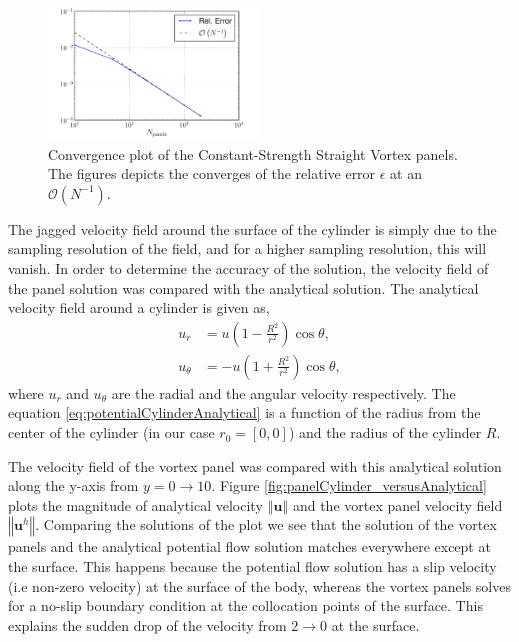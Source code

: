 	\begin{figure}[p]
	\centering
	\includegraphics[width=0.5\textwidth]{figures/lagrangian/panelCylinder_convergence_compressed.pdf}
	\caption{Convergence plot of the Constant-Strength Straight Vortex panels. The figures depicts the converges of the relative error $\epsilon$ at an $\mathcal{O}\left(N^{-1}\right)$.}
	\label{fig:panelCylinder_convergence}
	\end{figure}


The jagged velocity field around the surface of the cylinder is simply due to the sampling resolution of the field, and for a higher sampling resolution, this will vanish. In order to determine the accuracy of the solution, the velocity field of the panel solution was compared with the analytical solution. The analytical velocity field around a cylinder is given as,
	\begin{subequations}
	\begin{align}
	u_r &= u\left(1 - \frac{R^2}{r^2}\right)\cos\theta,\\
	u_{\theta} &= -u\left(1+\frac{R^2}{r^2}\right)\cos\theta,
	\end{align}
	\label{eq:potentialCylinderAnalytical}
	\end{subequations}	
where $u_r$ and $u_{\theta}$ are the radial and the angular velocity respectively. The equation \ref{eq:potentialCylinderAnalytical} is a function of the radius from the center of the cylinder (in our case $r_0 = [0, 0]$) and the radius of the cylinder $R$. 

The velocity field of the vortex panel was compared with this analytical solution along the y-axis from $y=0 \rightarrow 10$. Figure \ref{fig:panelCylinder_versusAnalytical} plots the magnitude of analytical velocity $\left\Vert\mathbf{u}\right\Vert$ and the vortex panel velocity field $\left\Vert\mathbf{u}^h\right\Vert$. Comparing the solutions of the plot we see that the solution of the vortex panels and the analytical potential flow solution matches everywhere except at the surface. This happens because the potential flow solution has a slip velocity (i.e non-zero velocity) at the surface of the body, whereas the vortex panels solves for a no-slip boundary condition at the collocation points of the surface. This explains the sudden drop of the velocity from $2\rightarrow0$ at the surface.	


